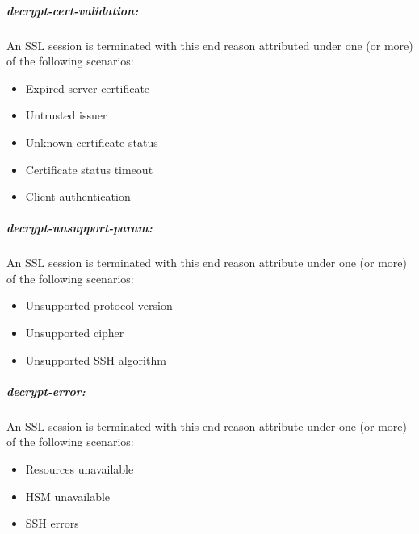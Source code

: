 \subparagraph{decrypt-cert-validation:}An SSL session is terminated with this end reason attributed under one (or more) of the following scenarios:
\begin{itemize}
    \item Expired server certificate
    \item Untrusted issuer
    \item Unknown certificate status
    \item Certificate status timeout
    \item Client authentication
\end{itemize}

\subparagraph{decrypt-unsupport-param:}An SSL session is terminated with this end reason attribute under one (or more) of the following scenarios:
\begin{itemize}
    \item Unsupported protocol version
    \item Unsupported cipher
    \item Unsupported SSH algorithm
\end{itemize}

\subparagraph{decrypt-error:}An SSL session is terminated with this end reason attribute under one (or more) of the following scenarios:
\begin{itemize}
    \item Resources unavailable
    \item HSM unavailable
    \item SSH errors
\end{itemize}
